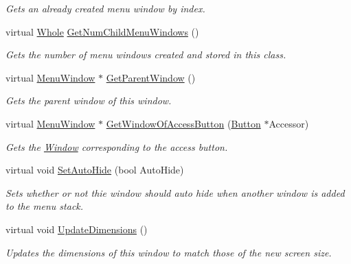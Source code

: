 \begin{DoxyCompactItemize}
\begin{DoxyCompactList}\small\item\em Gets an already created menu window by index. \item\end{DoxyCompactList}\item 
virtual \hyperlink{namespaceMezzanine_adcbb6ce6d1eb4379d109e51171e2e493}{Whole} \hyperlink{classMezzanine_1_1UI_1_1MenuWindow_aa6a04b93c0b65cb14941df11dade1a56}{GetNumChildMenuWindows} ()
\begin{DoxyCompactList}\small\item\em Gets the number of menu windows created and stored in this class. \item\end{DoxyCompactList}\item 
virtual \hyperlink{classMezzanine_1_1UI_1_1MenuWindow}{MenuWindow} $\ast$ \hyperlink{classMezzanine_1_1UI_1_1MenuWindow_ae112dc5c4a16e9d44f8dcb89e4ec73ec}{GetParentWindow} ()
\begin{DoxyCompactList}\small\item\em Gets the parent window of this window. \item\end{DoxyCompactList}\item 
virtual \hyperlink{classMezzanine_1_1UI_1_1MenuWindow}{MenuWindow} $\ast$ \hyperlink{classMezzanine_1_1UI_1_1MenuWindow_a6c00a489b0752a9d0b2f61f383529aee}{GetWindowOfAccessButton} (\hyperlink{classMezzanine_1_1UI_1_1Button}{Button} $\ast$Accessor)
\begin{DoxyCompactList}\small\item\em Gets the \hyperlink{classMezzanine_1_1UI_1_1Window}{Window} corresponding to the access button. \item\end{DoxyCompactList}\item 
virtual void \hyperlink{classMezzanine_1_1UI_1_1MenuWindow_aea2caf3b37d645fca123611060ccfa4f}{SetAutoHide} (bool AutoHide)
\begin{DoxyCompactList}\small\item\em Sets whether or not thie window should auto hide when another window is added to the menu stack. \item\end{DoxyCompactList}\item 
virtual void \hyperlink{classMezzanine_1_1UI_1_1MenuWindow_a9100422fa989e3c3d41e9b22046773f7}{UpdateDimensions} ()
\begin{DoxyCompactList}\small\item\em Updates the dimensions of this window to match those of the new screen size. \item\end{DoxyCompactList}\end{DoxyCompactItemize}
